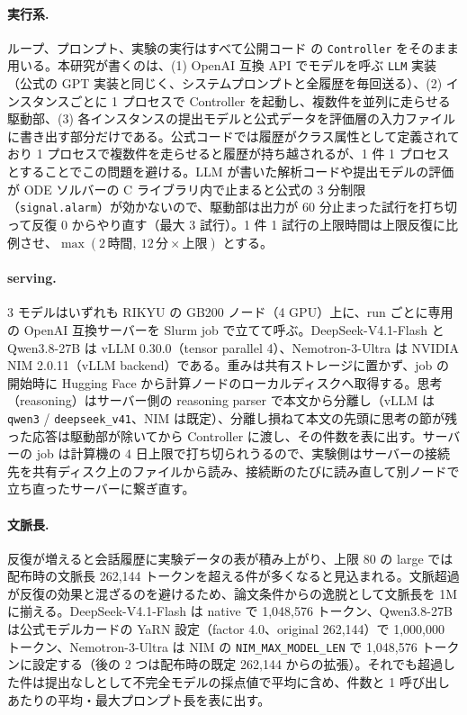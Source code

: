 \documentclass{article}
\begin{document}
\paragraph{実行系.}
ループ、プロンプト、実験の実行はすべて公開コード \citep{h4duan-2025-scigym} の \texttt{Controller} をそのまま用いる。本研究が書くのは、(1) OpenAI 互換 API でモデルを呼ぶ \texttt{LLM} 実装（公式の GPT 実装と同じく、システムプロンプトと全履歴を毎回送る）、(2) インスタンスごとに 1 プロセスで Controller を起動し、複数件を並列に走らせる駆動部、(3) 各インスタンスの提出モデルと公式データを評価層の入力ファイルに書き出す部分だけである。公式コードでは履歴がクラス属性として定義されており 1 プロセスで複数件を走らせると履歴が持ち越されるが、1 件 1 プロセスとすることでこの問題を避ける。LLM が書いた解析コードや提出モデルの評価が ODE ソルバーの C ライブラリ内で止まると公式の 3 分制限（\texttt{signal.alarm}）が効かないので、駆動部は出力が 60 分止まった試行を打ち切って反復 0 からやり直す（最大 3 試行）。1 件 1 試行の上限時間は上限反復に比例させ、$\max(2\,\text{時間},\ 12\,\text{分} \times \text{上限})$ とする。

\paragraph{serving.}
3 モデルはいずれも RIKYU の GB200 ノード（4 GPU）上に、run ごとに専用の OpenAI 互換サーバーを Slurm job で立てて呼ぶ。DeepSeek-V4.1-Flash と Qwen3.8-27B は vLLM 0.30.0（tensor parallel 4）、Nemotron-3-Ultra は NVIDIA NIM 2.0.11（vLLM backend）である。重みは共有ストレージに置かず、job の開始時に Hugging Face から計算ノードのローカルディスクへ取得する。思考（reasoning）はサーバー側の reasoning parser で本文から分離し（vLLM は \texttt{qwen3} / \texttt{deepseek\_v41}、NIM は既定）、分離し損ねて本文の先頭に思考の節が残った応答は駆動部が除いてから Controller に渡し、その件数を表に出す。サーバーの job は計算機の 4 日上限で打ち切られうるので、実験側はサーバーの接続先を共有ディスク上のファイルから読み、接続断のたびに読み直して別ノードで立ち直ったサーバーに繋ぎ直す。

\paragraph{文脈長.}
反復が増えると会話履歴に実験データの表が積み上がり、上限 80 の large では配布時の文脈長 262,144 トークンを超える件が多くなると見込まれる。文脈超過が反復の効果と混ざるのを避けるため、論文条件からの逸脱として文脈長を 1M に揃える。DeepSeek-V4.1-Flash は native で 1,048,576 トークン、Qwen3.8-27B は公式モデルカードの YaRN 設定（factor 4.0、original 262,144）で 1,000,000 トークン、Nemotron-3-Ultra は NIM の \texttt{NIM\_MAX\_MODEL\_LEN} で 1,048,576 トークンに設定する（後の 2 つは配布時の既定 262,144 からの拡張）。それでも超過した件は提出なしとして不完全モデルの採点値で平均に含め、件数と 1 呼び出しあたりの平均・最大プロンプト長を表に出す。
\end{document}

